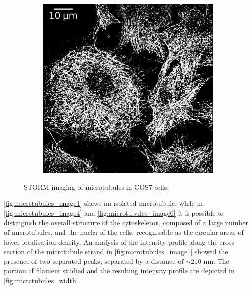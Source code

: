 \begin{figure}
\begin{subfigure}{0.32\textwidth}
        \caption{}
        \label{fig:microtubules_image4}
    \end{subfigure}
    \begin{subfigure}{0.32\textwidth}
        \includegraphics[width=\textwidth]{figures/microtubules_image6.png}
        \caption{}
        \label{fig:microtubules_image6}
    \end{subfigure}
    \caption{STORM imaging of microtubules in COS7 cells.}
    \label{fig:microtubules_images}
\end{figure}
%
\autoref{fig:microtubules_image1} shows an isolated microtubule, while in \autoref{fig:microtubules_image4} and \autoref{fig:microtubules_image6} it is possible to distinguish the overall structure of the cytoskeleton, composed of a large number of microtubules, and the nuclei of the cells, recognisable as the circular areas of lower localisation density.
An analysis of the intensity profile along the cross section of the microtubule strand in \autoref{fig:microtubules_image1} showed the presence of two separated peaks, separated by a distance of $\sim210$ nm.
The portion of filament studied and the resulting intensity profile are depicted in \autoref{fig:microtubules_width}.
%
